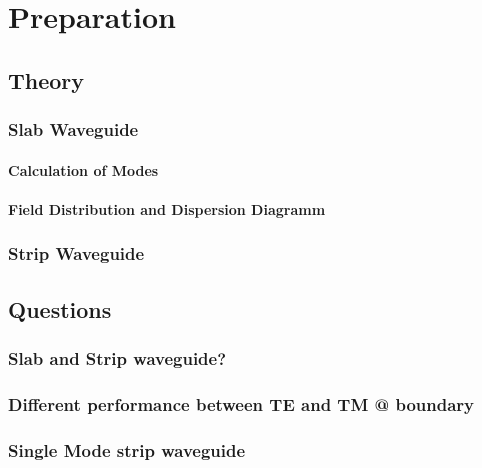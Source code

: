 \chapter{Preparation}

\section{Theory}

\subsection{Slab Waveguide}
\subsubsection{Calculation of Modes}
\subsubsection{Field Distribution and Dispersion Diagramm}


\subsection{Strip Waveguide}



\section{Questions}

\subsection{Slab and Strip waveguide?}

\subsection{Different performance between TE and TM @ boundary}

\subsection{Single Mode strip waveguide}
